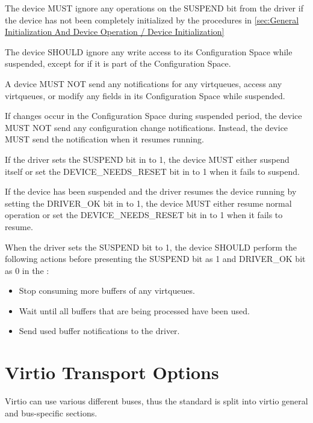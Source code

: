 The device MUST ignore any operations on the SUSPEND bit from the driver if the device has not been completely initialized by the procedures in \ref{sec:General Initialization And Device Operation / Device Initialization}

The device SHOULD ignore any write access to its Configuration Space while
suspended, except for  if it is part of the Configuration Space.

A device MUST NOT send any notifications for any virtqueues,
access any virtqueues, or modify any fields in
its Configuration Space while suspended.

If changes occur in the Configuration Space during suspended period,
the device MUST NOT send any configuration change notifications.
Instead, the device MUST send the notification when it resumes running.

If the driver sets the SUSPEND bit in  to 1,
the device MUST either suspend itself or set the DEVICE_NEEDS_RESET bit in  to 1 when it fails to suspend.

If the device has been suspended and the driver resumes the device running by setting the DRIVER_OK bit in  to 1,
the device MUST either resume normal operation or set the DEVICE_NEEDS_RESET bit in  to 1 when it fails to resume.

When the driver sets the SUSPEND bit to 1,
the device SHOULD perform the following actions before presenting the SUSPEND bit as 1 and DRIVER_OK bit as 0 in the :

\begin{itemize}
\item Stop consuming more buffers of any virtqueues.
\item Wait until all buffers that are being processed have been used.
\item Send used buffer notifications to the driver.
\end{itemize}

\chapter{Virtio Transport Options}\label{sec:Virtio Transport Options}

Virtio can use various different buses, thus the standard is split
into virtio general and bus-specific sections.






